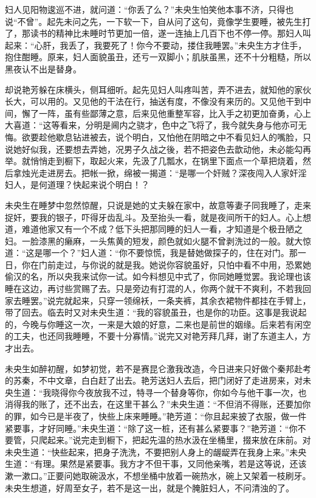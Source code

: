 \documentclass[a4paper,12pt,UTF8,twoside]{ctexbook}
\begin{document}
妇人见阳物逡巡不进，就问道：“你丢了么？”未央生怕笑他本事不济，只得也说“不曾”。起先未问之先，一下软一下，自从问了这句，竟像学生要睡，被先生打了，那读书的精神比未睡时节更加一倍，遂一连抽上几百下也不停一停。那妇人叫起来：“心肝，我丢了，我要死了！你今不要动，搂住我睡罢。”未央生方才住手，抱住酣睡。原来，妇人面貌虽丑，还亏一双脚小；肌肤虽黑，还不十分粗糙，所以黑夜认不出是替身。

却说艳芳躲在床横头，侧耳细听。起先见妇人叫疼叫苦，弄不进去，就知他的家伙长大，可以用的。又见他的干法在行，抽送有度，不像没有来历的。又见他干到中间，懈了一阵，虽有些鄙薄之意，后来见他重整军容，比入手之初更加奋勇，心上大喜道：“这等看来，分明是阃内之骁才，色中之飞将了，我今就失身与他亦可无悔。欲要趁他歇息钻进被去，说个明白，又怕他在阴暗之中不看见妇人的嘴脸，只说她好似我，还要想去弄她，况男子久战之後，若不把姿色去歆动他，未必能勾再举。就悄悄走到橱下，取起火来，先汲了几瓢水，在锅里下面点一个草把烧着，然后拿烛光走进房去。把帐一掀，绵被一揭道：“是哪一个奸贼？深夜闯入人家奸淫妇人，是何道理？快起来说个明白！？

未央生在睡梦中忽然惊醒，只说是她的丈夫躲在家中，故意等妻子同我睡了，走来捉奸，要我的银子，吓得牙齿乱斗。及至抬头一看，就是夜间所干的妇人。心上想道，难道他家又有一个不成？低下头把那同睡的妇人一看，才知道是个极丑陋之妇。一脸漆黑的癞麻，一头焦黄的短发，颜色就如火腿不曾剥洗过的一般。就大惊道：“这是哪一个？”妇人道：“你不要惊慌，我是替她做探子的，住在对门。那一日，你在门前走过，与你说的就是我。她说你容貌虽好，只怕中看不中用，恐累她偷汉的名，所以央我来试你一试。如今料想见中式了，你同她睡觉罢。我论理也该睡在这边，再讨些赏赐了去。只是旁边有打混的人，你两个就干不爽利，不若我回家去睡罢。”说完就起来，只穿一领绵袄，一条夹裤，其余衣裙物件都挂在手臂上，带了回去。临去时又对未央生道：“我的容貌虽丑，也是你的功臣。这事是我说起的，今晚与你睡这一次，一来是大娘的好意，二来也是前世的姻缘。后来若有闲空的工夫，也还同我睡睡，不要十分寡情。”说完又对艳芳拜几拜，谢了东道主人，方才出去。

未央生如醉初醒，如梦初觉，若不是赛昆仑激我改造，今日进来只好做个秦邦赴考的苏秦，不中文章，白白赶了出去。艳芳送妇人去后，把门闭好了走进房来，对未央生道：“我晓得你今夜放我不过，特寻一个替身等你，你如今与他干事一次，也消得我的账了，还不出去，在这里干甚么？”未央生道：“不但消不得账，还要加你的罪，如今已是半夜了，快些上床来睡睡。”艳芳道：“你且起来披了衣服，做一件紧要事，才好同睡。”未央生道：“除了这一桩，还有甚么紧要事？”艳芳道：“你不要管，只爬起来。”说完走到橱下，把起先温的热水汲在坐桶里，掇来放在床前。对未央生道：“快些起来，把身子洗洗，不要把别人身上的龌龊弄在我身上来。”未央生道：“有理。果然是紧要事。我方才不但干事，又同他亲嘴，若是这等说，还该漱一漱口。”正要问她取碗汲水，不想坐桶中放着一碗热水，碗上又架着一枝刷牙。未央生想道，好周至女子，若不是这一出，就是个腌脏妇人，不问清浊的了。
\end{document}
